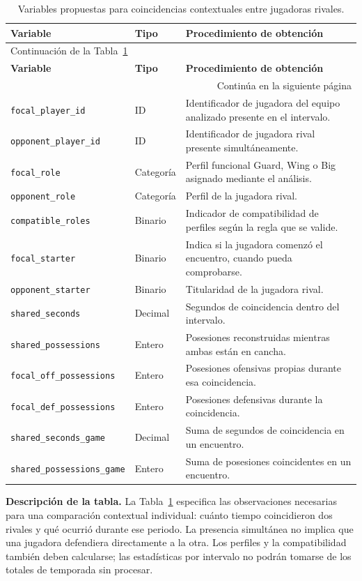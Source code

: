 \medskip

{\small
\renewcommand{\arraystretch}{1.15}
\begin{longtable}{@{}p{3.8cm}p{1.7cm}p{6.9cm}@{}}
\caption{Variables propuestas para coincidencias contextuales entre jugadoras rivales.}\label{tab:coincidencias_wnba}\\
\toprule\textbf{Variable}&\textbf{Tipo}&\textbf{Procedimiento de obtención}\\\midrule\endfirsthead
\multicolumn{3}{l}{\small Continuación de la Tabla~\ref{tab:coincidencias_wnba}}\\
\toprule\textbf{Variable}&\textbf{Tipo}&\textbf{Procedimiento de obtención}\\\midrule\endhead
\midrule\multicolumn{3}{r}{\small Continúa en la siguiente página}\\\endfoot
\bottomrule\endlastfoot
\texttt{focal\_player\_id}&ID&Identificador de jugadora del equipo analizado presente en el intervalo.\\
\texttt{opponent\_player\_id}&ID&Identificador de jugadora rival presente simultáneamente.\\
\texttt{focal\_role}&Categoría&Perfil funcional Guard, Wing o Big asignado mediante el análisis.\\
\texttt{opponent\_role}&Categoría&Perfil de la jugadora rival.\\
\texttt{compatible\_roles}&Binario&Indicador de compatibilidad de perfiles según la regla que se valide.\\
\texttt{focal\_starter}&Binario&Indica si la jugadora comenzó el encuentro, cuando pueda comprobarse.\\
\texttt{opponent\_starter}&Binario&Titularidad de la jugadora rival.\\
\texttt{shared\_seconds}&Decimal&Segundos de coincidencia dentro del intervalo.\\
\texttt{shared\_possessions}&Entero&Posesiones reconstruidas mientras ambas están en cancha.\\
\texttt{focal\_off\_possessions}&Entero&Posesiones ofensivas propias durante esa coincidencia.\\
\texttt{focal\_def\_possessions}&Entero&Posesiones defensivas durante la coincidencia.\\
\texttt{shared\_seconds\_game}&Decimal&Suma de segundos de coincidencia en un encuentro.\\
\texttt{shared\_possessions\_game}&Entero&Suma de posesiones coincidentes en un encuentro.\\
\end{longtable}
}

\noindent\textbf{Descripción de la tabla.}
La Tabla~\ref{tab:coincidencias_wnba} especifica las observaciones necesarias para una comparación contextual individual: cuánto tiempo coincidieron dos rivales y qué ocurrió durante ese periodo. La presencia simultánea no implica que una jugadora defendiera directamente a la otra. Los perfiles y la compatibilidad también deben calcularse; las estadísticas por intervalo no podrán tomarse de los totales de temporada sin procesar.